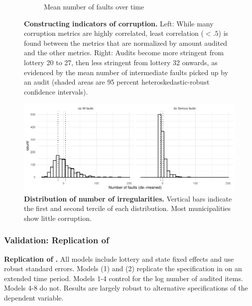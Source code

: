 {\begin{figure}[H]
\begin{subfigure}[b]{0.49\textwidth}
         \caption{Mean number of faults over time}
         \label{fig:corruptionOverTime}
     \end{subfigure}
    \caption{{\bf Constructing indicators of corruption.} Left: While many corruption metrics are highly correlated, least correlation ($< .5$) is found between the metrics that are normalized by amount audited and the other metrics. Right: Audits become more stringent from lottery 20 to 27, then less stringent from lottery 32 onwards, as evidenced by the mean number of intermediate faults picked up by an audit (shaded areas are 95 percent heteroskedastic-robust confidence intervals).}
    \label{fig:auditsOverTime}
\end{figure}

\begin{figure}[H]
    \centering
    \includegraphics{chapters/chapter_2/figures/distribNIrregularities}
    \caption{{\bf Distribution of number of irregularities.} Vertical bars indicate the first and second tercile of each distribution. Most municipalities show little corruption.}
    \label{fig:distribIrregularities}
\end{figure}

\begin{landscape}
    \subsubsection*{Validation: Replication of \citet{avis_government_2018}}
    \label{app:replication}

    \begin{table}[H]
        \centering
        \footnotesize
        
        \caption{{\bf Replication of \citet{avis_government_2018}.} All models include lottery and state fixed effects and use robust standard errors. Models (1) and (2) replicate the specification in \citet{avis_government_2018} on an extended time period. Models 1-4 control for the log number of audited items. Models 4-8 do not. Results are largely robust to alternative specifications of the dependent variable.}
        \label{tbl:replication}
    \end{table}    
\end{landscape}

}
